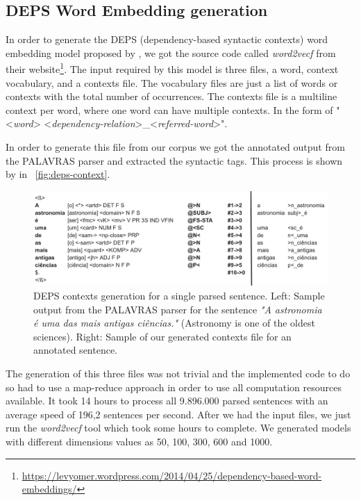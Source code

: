 
\subsection{DEPS Word Embedding generation}\label{chap:methodsandmaterials:depsgeneration}

In order to generate the DEPS (dependency-based syntactic contexts) word embedding model proposed by , we got the source code called \textit{word2vecf} from their website\footnote{\url{https://levyomer.wordpress.com/2014/04/25/dependency-based-word-embeddings/}}. The input required by this model is three files, a word, context vocabulary, and a contexts file. 
The vocabulary files are just a list of words or contexts with the total number of occurrences. The contexts file is a multiline context per word, where one word can have multiple contexts. In the form of "<\textit{word}> <\textit{dependency-relation}>\_<\textit{referred-word}>".

In order to generate this file from our corpus we got the annotated output from the PALAVRAS parser and extracted the syntactic tags. This process is shown by in ~\autoref{fig:deps-context}.

\begin{figure}[h]
    \caption{DEPS contexts generation for a single parsed sentence. Left: Sample output from the PALAVRAS parser for the sentence \textit{"A astronomia é uma das mais antigas ciências."} (Astronomy is one of the oldest sciences). Right: Sample of our generated contexts file for an annotated sentence.}
    \label{fig:deps-context}
    \centering%
    \begin{minipage}{.95\textwidth}
        \includegraphics[width=\textwidth]{deps-context.png}
    \end{minipage}
\end{figure}

The generation of this three files was not trivial and the implemented code to do so had to use a map-reduce approach in order to use all computation resources available. It took 14 hours to process all 9.896.000 parsed sentences with an average speed of 196,2 sentences per second.
After we had the input files, we just run the \textit{word2vecf} tool which took some hours to complete. We generated models with different dimensions values as 50, 100, 300, 600 and 1000.